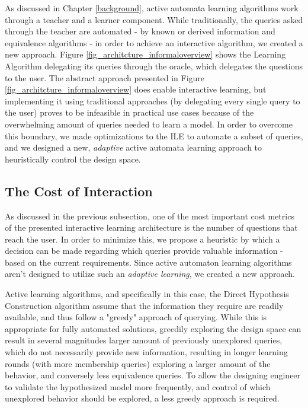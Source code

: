  \smallskip

 As discussed in Chapter \ref{background}, active automata learning algorithms work through a teacher and a learner component. While traditionally, the queries asked through the teacher are automated - by known or derived information and equivalence algorithms - in order to achieve an interactive algorithm, we created a new approach. Figure \ref{fig_architcture_informaloverview} shows the Learning Algorithm delegating its queries through the oracle, which delegates the questions to the user. The abstract approach presented in Figure \ref{fig_architcture_informaloverview} does enable interactive learning, but implementing it using traditional approaches (by delegating every single query to the user) proves to be infeasible in practical use cases because of the overwhelming amount of queries needed to learn a model. In order to overcome this boundary, we made optimizations to the ILE to automate a subset of queries, and we designed a new, \textit{adaptive} active automata learning approach to heuristically control the design space.

\subsection{The Cost of Interaction} \label{subs_commandhandling}

As discussed in the previous subsection, one of the most important cost metrics of the presented interactive learning architecture is the number of questions that reach the user. In order to minimize this, we propose a heuristic by which a decision can be made regarding which queries provide valuable information - based on the current requirements. Since active automaton learning algorithms aren't designed to utilize such an \textit{adaptive learning}, we created a new approach. 

Active learning algorithms, and specifically in this case, the Direct Hypothesis Construction algorithm assume that the information they require are readily available, and thus follow a "greedy" approach of querying. While this is appropriate for fully automated solutions, greedily exploring the design space can result in several magnitudes larger amount of previously unexplored queries, which do not necessarily provide new information, resulting in longer learning rounds (with more membership queries) exploring a larger amount of the behavior, and conversely less equivalence queries. To allow the designing engineer to validate the hypothesized model more frequently, and control of which unexplored behavior should be explored, a less greedy approach is required.


